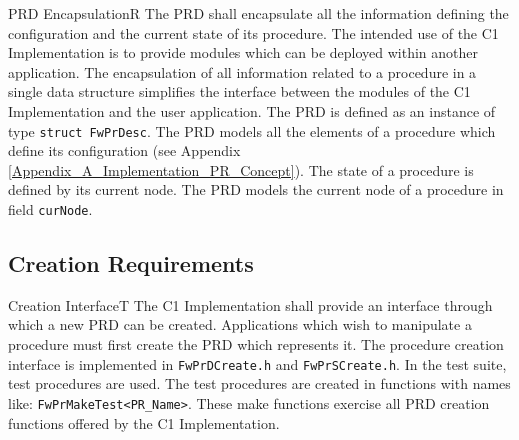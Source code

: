 \documentclass[requirements]{../fwprofile}
\begin{document}
\begin{fw_req}{PRD Encapsulation}{R}
{The PRD shall encapsulate all the information defining the configuration 
and the current state of its procedure.}
{The intended use of the C1 Implementation is to provide modules which can 
be deployed within another application. 
The encapsulation of all information related to a procedure in a single data structure simplifies 
the interface between the modules of the C1 Implementation and the user application.}
{The PRD is defined as an instance of type \texttt{struct FwPrDesc}.} 
{The PRD models all the elements of a procedure which define its configuration (see Appendix 
\ref{Appendix_A_Implementation_PR_Concept}).
The state of a procedure is defined by its current node.
The PRD models the current node of a procedure in field \texttt{curNode}.}
\end{fw_req}  

\subsection{Creation Requirements}\label{req:creationInterfacePRD}

\begin{fw_req}{Creation Interface}{T}
{ The C1 Implementation shall provide an interface through which a new PRD 
can be created.}
{Applications which wish to manipulate a procedure must first create the 
PRD which represents it.}
{The procedure creation interface is implemented in 
\texttt{FwPrDCreate.h} and \texttt{FwPrSCreate.h}.} 
{In the test suite, test procedures are used. The test procedures are 
created in functions with names like: \texttt{FwPrMakeTest<PR\_Name>}. 
These make functions exercise all PRD creation functions offered by the C1 Implementation.}
\end{fw_req}
\end{document}
